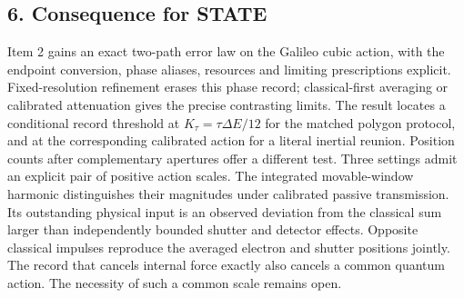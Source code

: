 \documentclass[11pt,a4paper]{article}
\begin{document}
\subsection{6. Consequence for STATE}\label{consequence-for-state}

Item 2 gains an exact two-path error law on the Galileo cubic action,
with the endpoint conversion, phase aliases, resources and limiting
prescriptions explicit. Fixed-resolution refinement erases this phase
record; classical-first averaging or calibrated attenuation gives the
precise contrasting limits. The result locates a conditional record
threshold at \(K_\tau=\tau\Delta E/12\) for the matched polygon
protocol, and at the corresponding calibrated action for a literal
inertial reunion. Position counts after complementary apertures offer a
different test. Three settings admit an explicit pair of positive action
scales. The integrated movable-window harmonic distinguishes their
magnitudes under calibrated passive transmission. Its outstanding
physical input is an observed deviation from the classical sum larger
than independently bounded shutter and detector effects. Opposite
classical impulses reproduce the averaged electron and shutter positions
jointly. The record that cancels internal force exactly also cancels a
common quantum action. The necessity of such a common scale remains
open.
\end{document}
